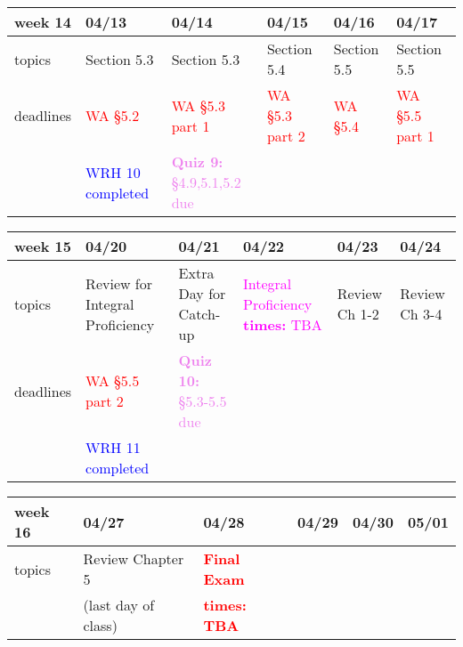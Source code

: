 \documentclass[11pt]{article}
\begin{document}
\begin{center}
\begin{tabularx}{\textwidth}{|p{1.5cm}|| L | L | L | L | L |}
\hline
week 14&04/13&04/14&04/15&04/16&04/17\\ \hline
topics &Section 5.3&Section 5.3&Section 5.4&Section 5.5&Section 5.5\\  \hline
deadlines&\textcolor{red}{WA \S 5.2}  &\textcolor{red}{WA \S 5.3 part 1}&\textcolor{red}{WA \S5.3 part 2}&\textcolor{red}{WA \S 5.4} & \textcolor{red}{WA \S 5.5 part 1}\\ 
&\textcolor{blue}{WRH 10 completed}&\textcolor{violet}{\textbf{Quiz 9:} \S4.9,5.1,5.2 due }&&&\\ \hline \end{tabularx} \end{center}

\begin{center}
\begin{tabularx}{\textwidth}{|p{1.5cm}|| L | L | L | L | L |}
\hline
week 15&04/20&04/21&04/22&04/23&04/24\\ \hline
topics&Review for Integral Proficiency&Extra Day for Catch-up&\textcolor{magenta}{Integral Proficiency \textbf{times:} TBA}&Review Ch 1-2&Review Ch 3-4\\ \hline
deadlines&\textcolor{red}{WA \S 5.5 part 2}&\textcolor{violet}{\textbf{Quiz 10:} \S 5.3-5.5 due }&&&\\ 
&\textcolor{blue}{WRH 11 completed}&&&& \\ \hline \end{tabularx} \end{center}

\begin{center}
\begin{tabularx}{\textwidth}{|p{1.5cm}|| L | L | L | L | L |}
\hline
week 16&04/27&04/28&04/29&04/30&05/01\\ \hline
topics&Review Chapter 5&\textcolor{red}{\textbf{Final Exam}} &&&\\ 
&(last day of class)&\textcolor{red}{\textbf{times: TBA}}&&&\\ \hline \hline
\end{tabularx} \end{center}
\end{document}
